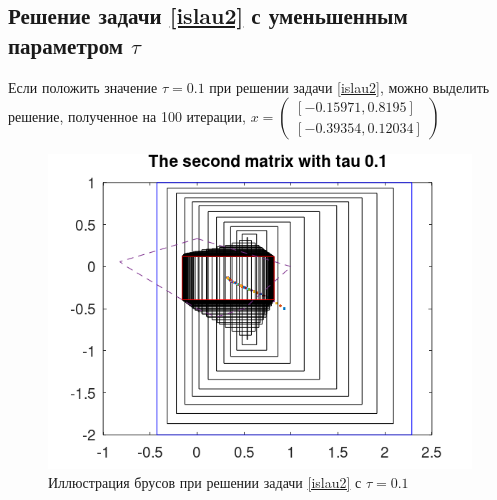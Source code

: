 \documentclass[12pt,a4paper]{article}
\begin{document}
\subsection{Решение задачи \eqref{islau2} с уменьшенным параметром $\tau$}
Если положить значение $\tau=0.1$ при решении задачи \eqref{islau2}, можно выделить решение, полученное на 100 итерации, $x=
\begin{pmatrix}
    [-0.15971,0.8195]\\
    [-0.39354,0.12034]
\end{pmatrix}$

\begin{figure}[H]
    \centering
    \includegraphics[scale=0.6]{Images/matrix3.png}
    \caption{Иллюстрация брусов при решении задачи \eqref{islau2} с $\tau=0.1$}
\end{figure}
\end{document}

